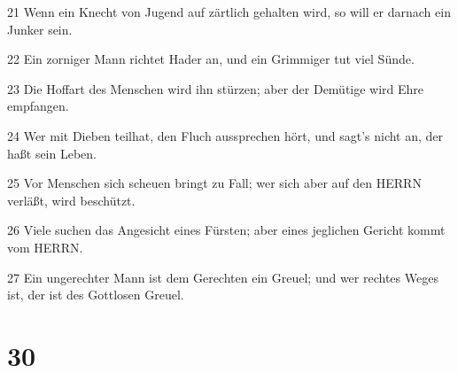 \par 21 Wenn ein Knecht von Jugend auf zärtlich gehalten wird, so will er darnach ein Junker sein.
\par 22 Ein zorniger Mann richtet Hader an, und ein Grimmiger tut viel Sünde.
\par 23 Die Hoffart des Menschen wird ihn stürzen; aber der Demütige wird Ehre empfangen.
\par 24 Wer mit Dieben teilhat, den Fluch aussprechen hört, und sagt's nicht an, der haßt sein Leben.
\par 25 Vor Menschen sich scheuen bringt zu Fall; wer sich aber auf den HERRN verläßt, wird beschützt.
\par 26 Viele suchen das Angesicht eines Fürsten; aber eines jeglichen Gericht kommt vom HERRN.
\par 27 Ein ungerechter Mann ist dem Gerechten ein Greuel; und wer rechtes Weges ist, der ist des Gottlosen Greuel.

\chapter{30}

